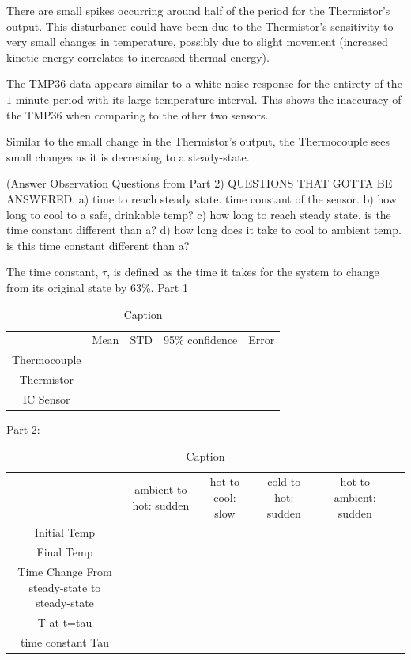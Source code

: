 \documentclass{article}
\begin{document}
    
    There are small spikes occurring around half of the period for the Thermistor's output. This disturbance could have been due to the Thermistor's sensitivity to very small changes in temperature, possibly due to slight movement (increased kinetic energy correlates to increased thermal energy).
    
    The TMP36 data appears similar to a white noise response for the entirety of the $1$ minute period with its large temperature interval. This shows the inaccuracy of the TMP36 when comparing to the other two sensors.
    
    Similar to the small change in the Thermistor's output, the Thermocouple sees small changes as it is decreasing to a steady-state. 

(Answer Observation Questions from Part 2)
QUESTIONS THAT GOTTA BE ANSWERED.
    a) time to reach steady state.  time constant of the sensor.  
    b) how long to cool to a safe, drinkable temp?
    c) how long to reach steady state.  is the time constant different than a?
    d) how long does it take to cool to ambient temp.  is this time constant different than a? 




The time constant, \(\tau\),  is defined as the time it takes for the system to change from its original state by 63\%.  %
Part 1 %
\begin{table}
    \centering
    \begin{tabular}{ccccc}
         &  Mean&  STD&  95\% confidence& Error\\
         Thermocouple&  &  &  & \\
         Thermistor&  &  &  & \\
         IC Sensor&  &  &  & \\
    \end{tabular}
    \caption{Caption}
    \label{tab:my_label}
\end{table}
    

Part 2: %

\begin{table}
    \centering
    \begin{tabular}{cccccc}
         &  ambient to hot: sudden&  hot to cool: slow&  cold to hot: sudden&  hot to ambient: sudden& \\
         Initial Temp&  &  &  &  & \\
         Final Temp&  &  &  &  & \\
         Time Change From steady-state to steady-state&  &  &  &  & \\
         T at t=tau&  &  &  &  & \\
         time constant Tau&  &  &  &  & \\
    \end{tabular}
    \caption{Caption}
    \label{tab:sudden_temp}
\end{table}
\end{document}
